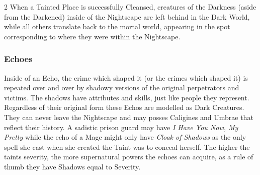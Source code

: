 \begin{multicols}{2}
When a Tainted Place is successfully Cleansed, creatures of the Darkness (aside from the Darkened) inside of the Nightscape are left behind in the Dark World, while all others translate back to the mortal world, appearing in the spot corresponding to where they were within the Nightscape.






\subsubsection*{Echoes}

Inside of an Echo, the crime which shaped it (or the crimes which shaped it) is repeated over and over by shadowy versions of the original perpetrators and victims. The shadows have attributes and skills, just like people they represent. Regardless of their original form these Echos are modelled as Dark Creatures. They can never leave the Nightscape and may posses Caligines and Umbrae that reflect their history. A sadistic prison guard may have \textit{I Have You Now, My Pretty} while the echo of a Mage might only have \textit{Cloak of Shadows} as the only spell she cast when she created the Taint was to conceal herself. The higher the taints severity, the more supernatural powers the echoes can acquire, as a rule of thumb they have Shadows equal to Severity. 


\end{multicols}
